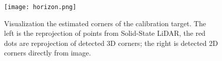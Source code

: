 \documentclass[journal]{vgtc}
\begin{document}


\begin{figure}[!htb]
	\centering
	\texttt{[image: horizon.png]}
	\\
	\caption{Visualization the estimated corners of the calibration target. The left is the reprojection of points from Solid-State LiDAR, the red dots are reprojection of detected 3D corners; the right is detected 2D corners directly from image. }
	\label{fig:corner_reprojection}  
\end{figure}
\end{document}
